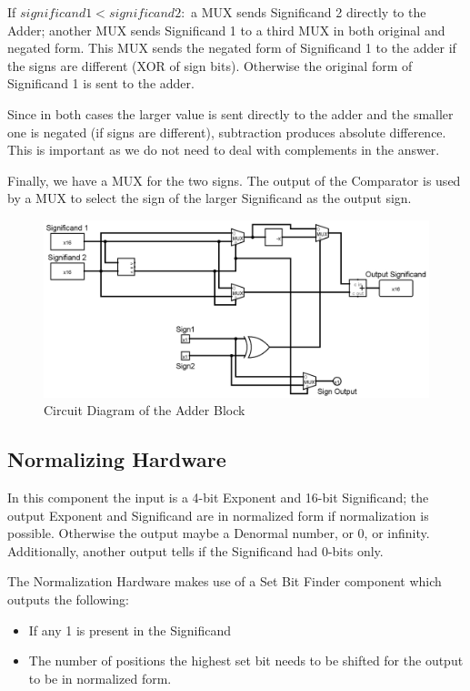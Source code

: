 \documentclass[12pt, a4paper]{article}
\begin{document}
	If $significand1 < significand2:$ a MUX sends Significand 2 directly to the
	Adder; another MUX sends Significand 1 to a third MUX in both original and
	negated form. This MUX sends the negated form of Significand 1 to the adder
	if the signs are different (XOR of sign bits). Otherwise the original form
	of Significand 1 is sent to the adder.

	Since in both cases the larger value is sent directly to the adder and the smaller one is negated (if signs are different), subtraction produces absolute difference. This is important as we do not need to deal with complements in the answer.

	Finally, we have a MUX for the two signs. The output of the Comparator  is
	used by a MUX to select the sign of the larger Significand as the output
	sign.
	\begin{figure}[h!]
		\centering
		\includegraphics[width = \linewidth]{adder}
		\caption{Circuit Diagram of the Adder Block}
		\label{fig7}
	\end{figure}
	\subsection{Normalizing Hardware}
	In this component the input is a 4-bit Exponent and 16-bit Significand; the output Exponent and Significand are in normalized form
	if normalization is possible. Otherwise the output maybe a Denormal number, or 0, or infinity. Additionally, another output tells
	if the Significand had 0-bits only.
	\newline

	The Normalization Hardware makes use of a Set Bit Finder component which outputs the following:
	\begin{itemize}
		\item If any 1 is present in the Significand
		\item The number of positions the highest set bit needs to be shifted for the output to be in normalized form.
	\end{itemize}
\end{document}
